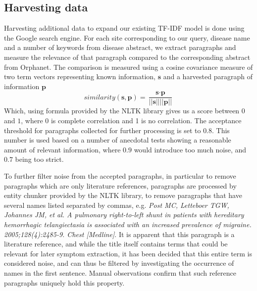\documentclass[10pt,letterpaper,final]{article}
\begin{document}
\subsection{Harvesting data}
Harvesting additional data to expand our existing TF-IDF model is done
using the Google search engine. For each site corresponding to our
query, disease name and a number of keywords from disease abstract, we
extract paragraphs and measure the relevance of that paragraph compared
to the corresponding abstract from Orphanet. The comparison is measured
using a cosine covariance measure of two term vectors representing
known information, $\textbf{s}$ and a harvested paragraph of information
$\textbf{p}$
\[
similarity(\textbf{s}, \textbf{p}) = \frac{\textbf{s} \cdot \textbf{p}}{||\textbf{s}|| ||\textbf{p}||}
\]
Which, using formula provided by the NLTK library gives us a score
between $0$ and $1$, where 0 is complete correlation and 1 is no
correlation. The acceptance threshold for paragraphs collected for
further processing is set to $0.8$. This number is used based on a
number of anecdotal tests showing a reasonable amount of relevant
information, where $0.9$ would introduce too much noise, and $0.7$
being too strict.

To further filter noise from the accepted paragraphs, in particular to
remove paragraphs which are only literature references, paragraphs are
processed by entity chunker provided by the NLTK library, to remove
paragraphs that have several names listed separated by commas, e.g.
\textit{Post MC, Letteboer TGW, Johannes JM, et al. A pulmonary
right-to-left shunt in patients with hereditary hemorrhagic
telangiectasia is associated with an increased prevalence of migraine.
2005;128(4):2485-9. Chest [Medline]}. It is apparent that this paragraph
is a literature reference, and while the title itself contains terms
that could be relevant for later symptom extraction, it has been decided
that this entire term is considered noise, and can thus be filtered by
investigating the occurrence of names in the first sentence. Manual
observations confirm that such reference paragraphs uniquely hold this
property.




\end{document}

